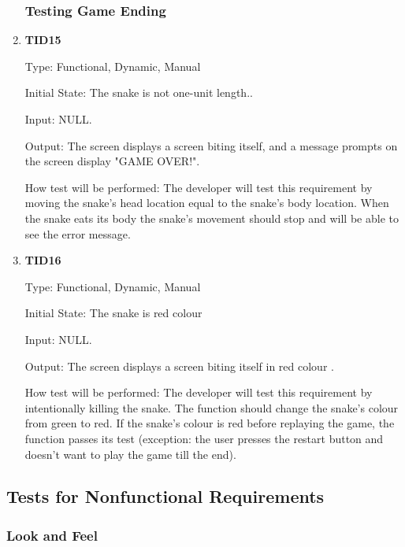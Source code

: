 \documentclass[12pt, titlepage]{article}
\begin{document}
\begin{enumerate}
\subsubsection{Testing Game Ending}
\item{\textbf{TID15}\\}

Type: Functional, Dynamic, Manual 	
					
Initial State: The snake is not one-unit length..
				
Input: NULL.

Output: The screen displays a screen biting itself, and a message prompts on the screen display "GAME OVER!".
        		
How test will be performed: The developer will test this requirement by moving the snake's head location equal to the snake's body location. When the snake eats its body the snake's movement should stop and will be able to see the error message.

\item{\textbf{TID16}\\}

Type: Functional, Dynamic, Manual 	
					
Initial State: The snake is red colour
				
Input: NULL.

Output: The screen displays a screen biting itself in red colour .
       		
How test will be performed: The developer will test this requirement by intentionally killing the snake. The function should change the snake's colour from green to red. If the snake's colour is red before replaying the game, the function passes its test (exception: the user presses the restart button and doesn't want to play the game till the end).
\end{enumerate}


\subsection{Tests for Nonfunctional Requirements}

\subsubsection{Look and Feel}
\end{document}
